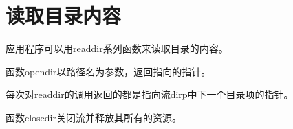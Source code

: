 
\section{读取目录内容}
{
    应用程序可以用readdir系列函数来读取目录的内容。

    函数opendir以路径名为参数，返回指向的指针。

    每次对readdir的调用返回的都是指向流dirp中下一个目录项的指针。

    函数closedir关闭流并释放其所有的资源。
}
